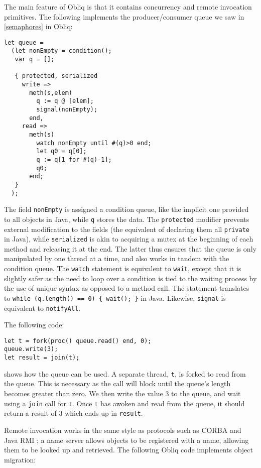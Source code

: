 The main feature of Obliq is that it contains concurrency and remote
invocation primitives.  The following implements the producer/consumer
queue we saw in \ref{semaphores} in Obliq:
\begin{verbatim}
let queue =
  (let nonEmpty = condition();
   var q = [];

   { protected, serialized
     write =>
       meth(s,elem)
         q := q @ [elem];
         signal(nonEmpty);
       end,
     read =>
       meth(s)
         watch nonEmpty until #(q)>0 end;
         let q0 = q[0];
         q := q[1 for #(q)-1];
         q0;
       end;
   }
  );
\end{verbatim}
The field \texttt{nonEmpty} is assigned a condition queue, like the
implicit one provided to all objects in Java, while \texttt{q} stores
the data.  The \texttt{protected} modifier prevents external
modification to the fields (the equivalent of declaring them all
\texttt{private} in Java), while \texttt{serialized} is akin to
acquiring a mutex at the beginning of each method and releasing it at
the end.  The latter thus ensures that the queue is only manipulated
by one thread at a time, and also works in tandem with the condition
queue.  The \texttt{watch} statement is equivalent to \texttt{wait},
except that it is slightly safer as the need to loop over a condition
is tied to the waiting process by the use of unique syntax as opposed
to a method call.  The statement translates to \texttt{while
  (q.length() == 0) \{ wait(); \}} in Java.  Likewise, \texttt{signal}
is equivalent to \texttt{notifyAll}.

The following code:
\begin{verbatim}
let t = fork(proc() queue.read() end, 0);
queue.write(3);
let result = join(t);
\end{verbatim}
shows how the queue can be used.  A separate thread, \texttt{t}, is
forked to read from the queue.  This is necessary as the call will
block until the queue's length becomes greater than zero.  We then
write the value 3 to the queue, and wait using a \texttt{join} call
for \texttt{t}. Once \texttt{t} has awoken and read from the queue, it
should return a result of 3 which ends up in \texttt{result}.

Remote invocation works in the same style as protocols such as CORBA
\cite{omg:2009} and Java RMI \cite{rmi}; a name server allows objects
to be registered with a name, allowing them to be looked up and
retrieved.  The following Obliq code implements object migration:

